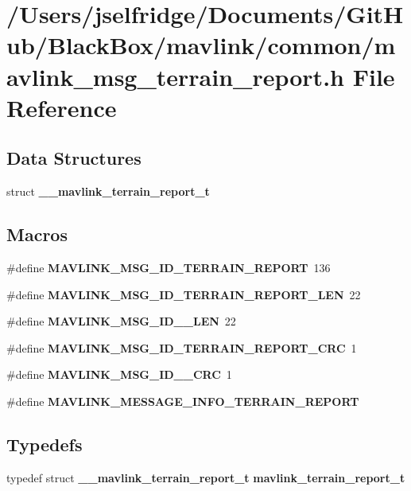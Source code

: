\section{/\+Users/jselfridge/\+Documents/\+Git\+Hub/\+Black\+Box/mavlink/common/mavlink\+\_\+msg\+\_\+terrain\+\_\+report.h File Reference}
\label{mavlink__msg__terrain__report_8h}
\subsection*{Data Structures}
\begin{DoxyCompactItemize}
\item 
struct \textbf{ \+\_\+\+\_\+mavlink\+\_\+terrain\+\_\+report\+\_\+t}
\end{DoxyCompactItemize}
\subsection*{Macros}
\begin{DoxyCompactItemize}
\item 
\#define \textbf{ M\+A\+V\+L\+I\+N\+K\+\_\+\+M\+S\+G\+\_\+\+I\+D\+\_\+\+T\+E\+R\+R\+A\+I\+N\+\_\+\+R\+E\+P\+O\+RT}~136
\item 
\#define \textbf{ M\+A\+V\+L\+I\+N\+K\+\_\+\+M\+S\+G\+\_\+\+I\+D\+\_\+\+T\+E\+R\+R\+A\+I\+N\+\_\+\+R\+E\+P\+O\+R\+T\+\_\+\+L\+EN}~22
\item 
\#define \textbf{ M\+A\+V\+L\+I\+N\+K\+\_\+\+M\+S\+G\+\_\+\+I\+D\+\_\+\_\+\+L\+EN}~22
\item 
\#define \textbf{ M\+A\+V\+L\+I\+N\+K\+\_\+\+M\+S\+G\+\_\+\+I\+D\+\_\+\+T\+E\+R\+R\+A\+I\+N\+\_\+\+R\+E\+P\+O\+R\+T\+\_\+\+C\+RC}~1
\item 
\#define \textbf{ M\+A\+V\+L\+I\+N\+K\+\_\+\+M\+S\+G\+\_\+\+I\+D\+\_\+\_\+\+C\+RC}~1
\item 
\#define \textbf{ M\+A\+V\+L\+I\+N\+K\+\_\+\+M\+E\+S\+S\+A\+G\+E\+\_\+\+I\+N\+F\+O\+\_\+\+T\+E\+R\+R\+A\+I\+N\+\_\+\+R\+E\+P\+O\+RT}
\end{DoxyCompactItemize}
\subsection*{Typedefs}
\begin{DoxyCompactItemize}
\item 
typedef struct \textbf{ \+\_\+\+\_\+mavlink\+\_\+terrain\+\_\+report\+\_\+t} \textbf{ mavlink\+\_\+terrain\+\_\+report\+\_\+t}
\end{DoxyCompactItemize}


